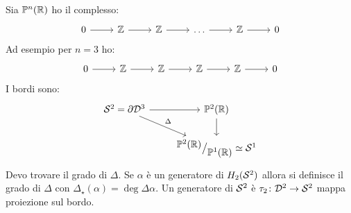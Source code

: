 Sia $ \mathbb{P}^{n} (\mathbb{R}) $ ho il complesso:
\[
  \begin{tikzcd}
    0 \rar & \Z \rar & \Z \rar & \dots  \rar & \Z \rar & 0
  \end{tikzcd}
\]
Ad esempio per $ n = 3 $ ho:
\[
  \begin{tikzcd}
    0 \rar & \Z \rar & \Z \rar & \Z \rar  & \Z \rar & 0
  \end{tikzcd}
\]
I bordi sono:
\[
  \begin{tikzcd}
    \Sph{2} = \partial \Disk{3} \rar \arrow{dr}{\Delta} & \Pjr{2} \dar \\
    {} & \quot{\Pjr{2}}{\Pjr{1}} \simeq \Sph{1}
  \end{tikzcd}
\]
Devo trovare il grado di $ \Delta $. Se $ \alpha $ è un generatore di
$ H_2(\mathcal{S}^{2}) $ allora si definisce il grado di $ \Delta $ con
$ \Delta_\star(\alpha) = \deg{\Delta} \alpha $. Un generatore di $ \mathcal{S}^{2} $ è
$ \tau_2 \colon \mathcal{D}^{2} \to \mathcal{S}^{2} $ mappa proiezione sul bordo.

